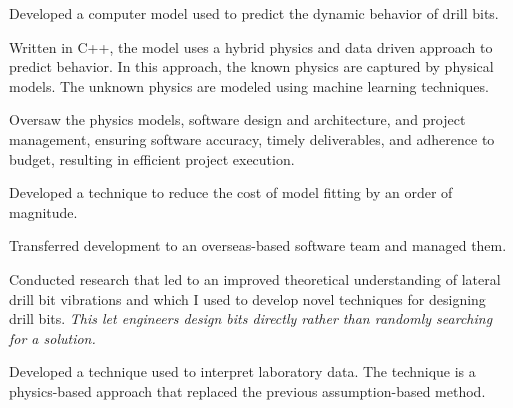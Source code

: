 \documentclass{leresume}
\begin{document}
		\begin{bulletedlist}
			
		\item
		
				Developed a computer model used to predict the dynamic behavior of drill bits.
				
		\begin{bulletedlist}
			
		\item
		
						Written in C++, the model uses a hybrid physics and data driven approach to predict behavior.  In this approach, the known physics are captured by physical models.  The unknown physics are modeled using machine learning techniques.
					
		\item
		
						Oversaw the physics models, software design and architecture, and project management, ensuring software accuracy, timely deliverables, and adherence to budget, resulting in efficient project execution.
					
		\item
		
						Developed a technique to reduce the cost of model fitting by an order of magnitude.
					
		\item
		Transferred development to an overseas-based software team and managed them.
		\end{bulletedlist}
	
		\item
		
				Conducted research that led to an improved theoretical understanding of lateral drill bit vibrations and which I used to develop novel techniques for
				designing drill bits. 
		\textit{This let engineers design bits directly rather than randomly searching for a solution.}
	
		\item
		Developed a technique used to interpret laboratory data.  The technique is a physics-based approach that replaced the previous assumption-based method.
		\end{bulletedlist}
	
		
		
\end{document}
